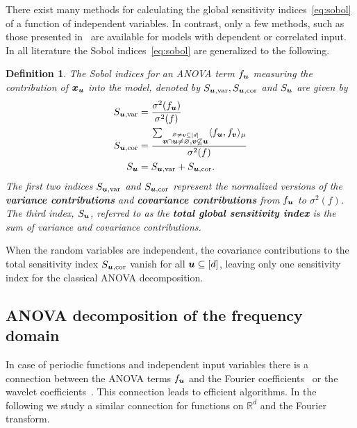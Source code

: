 \documentclass{article}
\renewcommand{\vec}[1]{\ensuremath \mathbf{\boldsymbol{#1}}}
\newcommand{\x}{\ensuremath{\vec x}}
\newcommand{\R}{\ensuremath{\mathbb{R}}}
\theoremstyle{definition}
\newtheorem{definition}[theorem]{Definition}
\newenvironment{Definition}{ \begin{definition}\normalfont\slshape}{\end{definition}}
\numberwithin{equation}{section}
\begin{document}
There exist many methods for calculating the global sensitivity indices~\eqref{eq:sobol} of a function of independent variables. In contrast, only a few methods,
such as those presented in~\cite{ChGa12, Ho07, KuTaAn12, LiRa12, Ra142} are available for models with dependent or correlated
input. In all literature the Sobol indices~\eqref{eq:sobol} are generalized to the following.
\begin{Definition}\label{def:sobol_indices}
The Sobol indices for an ANOVA term $f_{\vec u}$ measuring the contribution of $\x_{\vec u}$ into the model, denoted by $S_{\vec u, \text{var}}, S_{\vec u, \text{cor}}$ and $S_{\vec u} $ are given by 
\begin{align*}
S_{\vec u, \text{var}} &= \frac{\sigma^2(f_{\vec u})}{\sigma^2(f)}\\
S_{\vec u, \text{cor}} &= \frac{\sum_{\stackrel{\varnothing \neq \vec v \subseteq [d]}{\vec v\cap \vec u\neq \varnothing, \vec v\not\subseteq \vec u}} \langle f_{\vec u},f_{\vec v}\rangle_{\mu}}{\sigma^2(f)} \\
S_{\vec u} &=  S_{\vec u, \text{var}} + S_{\vec u, \text{cor}}.
\end{align*}
The first two indices $S_{\vec u, \text{var}}$ and $S_{\vec u, \text{cor}}$ represent the normalized versions of the \textbf{variance contributions} and \textbf{covariance contributions} from $f_{\vec u}$ to $\sigma^2(f)$. The third index, $S_{\vec u}$, referred to as the \textbf{total global sensitivity index} is the sum of variance and covariance contributions. 
\end{Definition}
When the random variables are independent, the covariance contributions to the total sensitivity index $S_{\vec u, \text{cor}}$ vanish for all $\vec u\subseteq [d]$, leaving only one sensitivity index for the classical ANOVA decomposition.  


\subsection{ANOVA decomposition of the frequency domain}\label{sec:tempered_distributions}
In case of periodic functions and independent input variables there is a connection between the ANOVA terms $f_{\vec u}$ and the Fourier coefficients~\cite{PoSc19a} or the wavelet coefficients~\cite{LiPoUl21}. This connection leads to efficient algorithms. In the following we study a similar connection for functions on $\R^d$ and the Fourier transform. 
\end{document}
